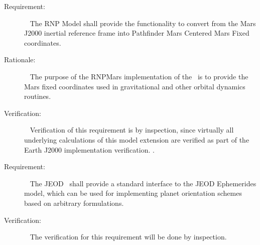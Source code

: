 \label{reqt:mars_RNP_func}
\begin{description}
  \item[Requirement:]\ \newline
The RNP Model shall provide the functionality to convert from the Mars J2000
inertial reference frame into Pathfinder Mars Centered Mars Fixed coordinates.
  \item[Rationale:]\ \newline
The purpose of the RNPMars implementation of the
\ModelDesc\ is to provide the Mars fixed 
coordinates used in gravitational and other orbital dynamics routines.
  \item[Verification:]\ \newline
Verification of this requirement is by inspection, since virtually all
underlying calculations of this model extension are verified as part of the
Earth J2000 implementation verification.
\cite{dynenv:JEOD}.
\end{description}

\label{reqt:Planet_Orientation_extension}
\begin{description}
\item[Requirement:]\ \newline
The JEOD \ModelDesc\ shall provide a standard interface to
the JEOD Ephemerides model, which can be used for implementing planet orientation
schemes based on arbitrary formulations.
\item[Verification:]\ \newline
The verification for this requirement will be done by inspection.
\end{description}

